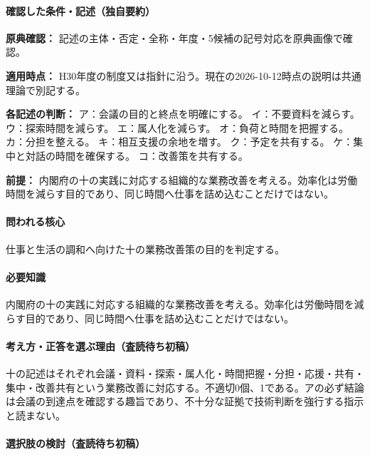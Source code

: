\paragraph{確認した条件・記述（独自要約）}\mbox{}\par

\noindent\textbf{原典確認：} 記述の主体・否定・全称・年度・5候補の記号対応を原典画像で確認。\par

\noindent\textbf{適用時点：} H30年度の制度又は指針に沿う。現在の2026-10-12時点の説明は共通理論で別記する。\par

\noindent\textbf{各記述の判断：} ア：会議の目的と終点を明確にする。 イ：不要資料を減らす。 ウ：探索時間を減らす。 エ：属人化を減らす。 オ：負荷と時間を把握する。 カ：分担を整える。 キ：相互支援の余地を増す。 ク：予定を共有する。 ケ：集中と対話の時間を確保する。 コ：改善策を共有する。\par

\noindent\textbf{前提：} 内閣府の十の実践に対応する組織的な業務改善を考える。効率化は労働時間を減らす目的であり、同じ時間へ仕事を詰め込むことだけではない。\par

\paragraph{問われる核心} 仕事と生活の調和へ向けた十の業務改善策の目的を判定する。

\paragraph{必要知識} 内閣府の十の実践に対応する組織的な業務改善を考える。効率化は労働時間を減らす目的であり、同じ時間へ仕事を詰め込むことだけではない。

\paragraph{考え方・正答を選ぶ理由（査読待ち初稿）} 十の記述はそれぞれ会議・資料・探索・属人化・時間把握・分担・応援・共有・集中・改善共有という業務改善に対応する。不適切0個、1である。アの必ず結論は会議の到達点を確認する趣旨であり、不十分な証拠で技術判断を強行する指示と読まない。

\paragraph{選択肢の検討（査読待ち初稿）}\mbox{}\par

